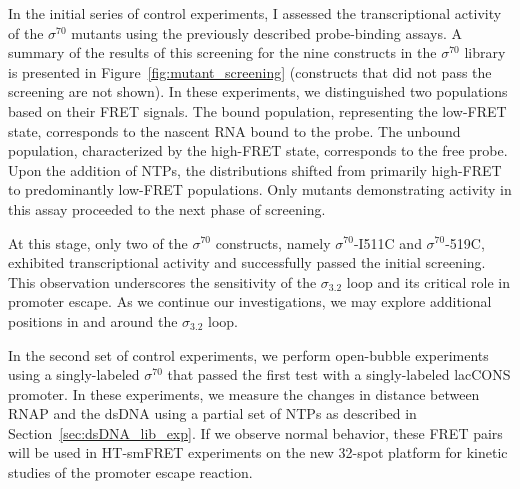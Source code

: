 In the initial series of control experiments, I assessed the transcriptional activity of the $\sigma^{70}$ mutants using the previously described probe-binding assays. 
A summary of the results of this screening for the nine constructs in the $\sigma^{70}$ library is presented in Figure~\ref{fig:mutant_screening} (constructs that did not pass the screening are not shown).
In these experiments, we distinguished two populations based on their FRET signals. 
The bound population, representing the low-FRET state, corresponds to the nascent RNA bound to the probe. 
The unbound population, characterized by the high-FRET state, corresponds to the free probe. 
Upon the addition of \ac{NTP}s, the distributions shifted from primarily high-FRET to predominantly low-FRET populations. 
Only mutants demonstrating activity in this assay proceeded to the next phase of screening.

At this stage, only two of the $\sigma^{70}$ constructs, namely $\sigma^{70}$-I511C and $\sigma^{70}$-519C, exhibited transcriptional activity and successfully passed the initial screening. 
This observation underscores the sensitivity of the $\sigma_{3.2}$ loop and its critical role in promoter escape. 
As we continue our investigations, we may explore additional positions in and around the $\sigma_{3.2}$ loop.

In the second set of control experiments, we perform open-bubble experiments using a singly-labeled $\sigma^{70}$ that passed the first test with a singly-labeled \ac{lacCONS} promoter. 
In these experiments, we measure the changes in distance between \ac{RNAP} and the \ac{dsDNA} using a partial set of \ac{NTP}s as described in Section~\ref{sec:dsDNA_lib_exp}.
If we observe normal behavior, these FRET pairs will be used in \ac{HT-smFRET} experiments on the new 32-spot platform for kinetic studies of the promoter escape reaction. 

